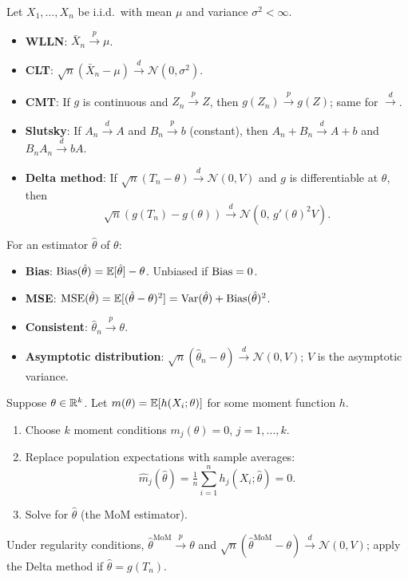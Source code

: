 \begin{remark}
	Let $X_1,\ldots,X_n$ be i.i.d.\ with mean $\mu$ and variance $\sigma^2<\infty$.
	\begin{itemize}
		\item \textbf{WLLN}: $\bar X_n\xrightarrow{p}\mu$.
		\item \textbf{CLT}: $\sqrt{n}(\bar X_n-\mu)\xrightarrow{d}\mathcal{N}(0,\sigma^2)$.
		\item \textbf{CMT}: If $g$ is continuous and $Z_n\xrightarrow{p}Z$, then $g(Z_n)\xrightarrow{p}g(Z)$; same for $\xrightarrow{d}$.
		\item \textbf{Slutsky}: If $A_n\xrightarrow{d}A$ and $B_n\xrightarrow{p}b$ (constant), then $A_n+B_n\xrightarrow{d}A+b$ and $B_nA_n\xrightarrow{d}bA$.
		\item \textbf{Delta method}: If $\sqrt{n}(T_n-\theta)\xrightarrow{d}\mathcal{N}(0,V)$ and $g$ is differentiable at $\theta$, then
		      \[
			      \sqrt{n}(g(T_n)-g(\theta))\xrightarrow{d}\mathcal{N}(0,\,g'(\theta)^2 V).
		      \]
	\end{itemize}
\end{remark}

\begin{remark}
	For an estimator $\hat\theta$ of $\theta$:
	\begin{itemize}
		\item \textbf{Bias}: $\operatorname{Bias}(\hat\theta)=\mathbb{E}[\hat\theta]-\theta$. Unbiased if $\operatorname{Bias}=0$.
		\item \textbf{MSE}: $\operatorname{MSE}(\hat\theta)=\mathbb{E}[(\hat\theta-\theta)^2]=\operatorname{Var}(\hat\theta)+\operatorname{Bias}(\hat\theta)^2$.
		\item \textbf{Consistent}: $\hat\theta_n\xrightarrow{p}\theta$.
		\item \textbf{Asymptotic distribution}: $\sqrt{n}(\hat\theta_n-\theta)\xrightarrow{d}\mathcal{N}(0,V)$; $V$ is the asymptotic variance.
	\end{itemize}
\end{remark}

\begin{remark}
	Suppose $\theta\in\mathbb{R}^k$. Let $m(\theta)=\mathbb{E}[h(X_i;\theta)]$ for some moment function $h$.
	\begin{enumerate}
		\item Choose $k$ moment conditions $m_j(\theta)=0$, $j=1,\ldots,k$.
		\item Replace population expectations with sample averages:
		      \[\hat m_j(\hat\theta)=\tfrac{1}{n}\textstyle\sum_{i=1}^n h_j(X_i;\hat\theta)=0.\]
		\item Solve for $\hat\theta$ (the MoM estimator).
	\end{enumerate}
	Under regularity conditions, $\hat\theta^{\text{MoM}}\xrightarrow{p}\theta$ and $\sqrt{n}(\hat\theta^{\text{MoM}}-\theta)\xrightarrow{d}\mathcal{N}(0,V)$; apply the Delta method if $\hat\theta=g(T_n)$.
\end{remark}

